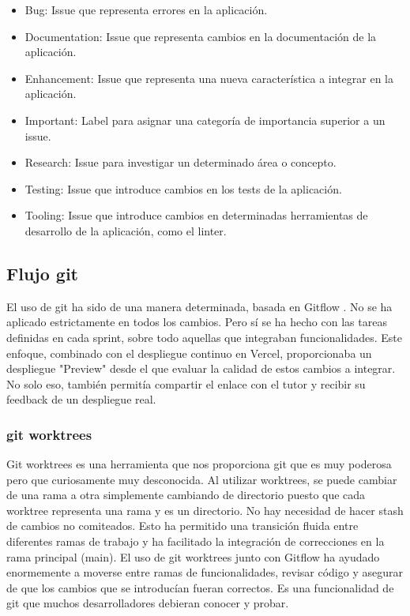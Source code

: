\begin{itemize}\tightlist
    \item Bug: Issue que representa errores en la aplicación.
    \item Documentation: Issue que representa cambios en la documentación de la aplicación.
    \item Enhancement: Issue que representa una nueva característica a integrar en la aplicación.
    \item Important: Label para asignar una categoría de importancia superior a un issue.
    \item Research: Issue para investigar un determinado área o concepto.
    \item Testing: Issue que introduce cambios en los tests de la aplicación.
    \item Tooling: Issue que introduce cambios en determinadas herramientas de desarrollo de la aplicación, como el linter.
\end{itemize}

\subsection{Flujo git}
El uso de git ha sido de una manera determinada, basada en Gitflow \cite{gitflow}. No se ha aplicado estrictamente en todos los cambios. Pero sí se ha hecho con las tareas definidas en cada sprint, sobre todo aquellas que integraban funcionalidades. Este enfoque, combinado con el despliegue continuo en Vercel, proporcionaba un despliegue "Preview" desde el que evaluar la calidad de estos cambios a integrar. No solo eso, también permitía compartir el enlace con el tutor y recibir su feedback de un despliegue real.

\subsubsection{git worktrees}
Git worktrees \cite{git-worktree} es una herramienta que nos proporciona git que es muy poderosa pero que curiosamente muy desconocida. Al utilizar worktrees, se puede cambiar de una rama a otra simplemente cambiando de directorio puesto que cada worktree representa una rama y es un directorio. No hay necesidad de hacer stash de cambios no comiteados. Esto ha permitido una transición fluida entre diferentes ramas de trabajo y ha facilitado la integración de correcciones en la rama principal (main).
El uso de git worktrees junto con Gitflow ha ayudado enormemente a moverse entre ramas de funcionalidades, revisar código y asegurar de que los cambios que se introducían fueran correctos. Es una funcionalidad de git que muchos desarrolladores debieran conocer y probar.

